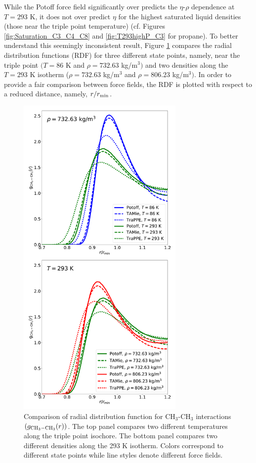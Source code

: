 \documentclass[preprint,review,12pt]{elsarticle}
\begin{document}
	While the Potoff force field significantly over predicts the $\eta$-$\rho$ dependence at $T= 293$ K, it does not over predict $\eta$ for the highest saturated liquid densities (those near the triple point temperature) (cf. Figures \ref{fig:Saturation_C3_C4_C8} and \ref{fig:T293highP_C3} for propane). To better understand this seemingly inconsistent result, Figure \ref{fig:RDF_comparison_CH3} compares the radial distribution functions (RDF) for three different state points, namely, near the triple point $(T=86$ K and $\rho = 732.63$ kg/m$^3)$ and two densities along the $T = 293$ K isotherm ($\rho = 732.63$ kg/m$^3$ and $\rho = 806.23$ kg/m$^3)$. In order to provide a fair comparison between force fields, the RDF is plotted with respect to a reduced distance, namely, $r/r_{\rm min}$.
	
	
	\begin{figure}[htb!]
		\centering
		\includegraphics[width=3.2in]{RDF_comparison_CH3.pdf}
		\caption{Comparison of radial distribution function for CH$_3$-CH$_3$ interactions $(g_{\rm CH_3-CH_3}(r))$. The top panel compares two different temperatures along the triple point isochore. The bottom panel compares two different densities along the 293 K isotherm. Colors correspond to different state points while line styles denote different force fields.}
		\label{fig:RDF_comparison_CH3}
	\end{figure} 
	
\end{document}
